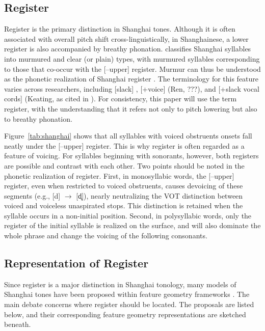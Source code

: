 \documentclass[11pt]{article}
\begin{document}

\subsection{Register}
Register is the primary distinction in Shanghai tones. Although it is often 
associated with overall pitch shift cross-linguistically, in Shanghainese, a 
lower register is also accompanied by breathy phonation. \citet{yip1980} 
classifies Shanghai syllables into murmured and clear (or plain) types, with 
murmured syllables corresponding to those that co-occur with the [–upper] 
register. Murmur can thus be 
understood as the phonetic realization of Shanghai register 
\citep{zhu1999shanghai}. The terminology for this feature varies across 
researchers, including [slack] \citep{duanmu1999metrical}, [+voice] (Ren, ???), 
and [+slack vocal cords] (Keating, as cited in \citealt{yip1993tonal}). For 
consistency, this paper will use the term register, with the understanding that 
it refers not only to pitch lowering but also to breathy phonation.

Figure~\ref{tab:shanghai} shows that all syllables with voiced obstruents 
onsets fall neatly under the [–upper] register. This is why register is often 
regarded as a feature of voicing. For syllables beginning with sonorants, 
however, both registers are possible and contrast with each other. Two points 
should be noted in the phonetic realization of register. First, in monosyllabic 
words, the [–upper] register, even when restricted to voiced obstruents, causes 
devoicing of these segments (e.g., [d] $\rightarrow$ [d̥]), nearly neutralizing 
the VOT distinction between voiced and voiceless unaspirated stops. This 
distinction is retained when the syllable occurs in a non-initial position. 
Second, in polysyllabic words, only the register of the initial syllable is 
realized on the surface, and will also dominate the whole phrase and change the 
voicing of the following consonants.

\subsection{Representation of Register}
Since register is a major distinction in Shanghai tonology, many models of 
Shanghai tones have been proposed within feature geometry frameworks 
\citep{clements1985,sagey1986feature}. The main debate concerns where register should be 
located. The proposals are listed below, and their corresponding feature geometry representations are sketched beneath.
\end{document}
